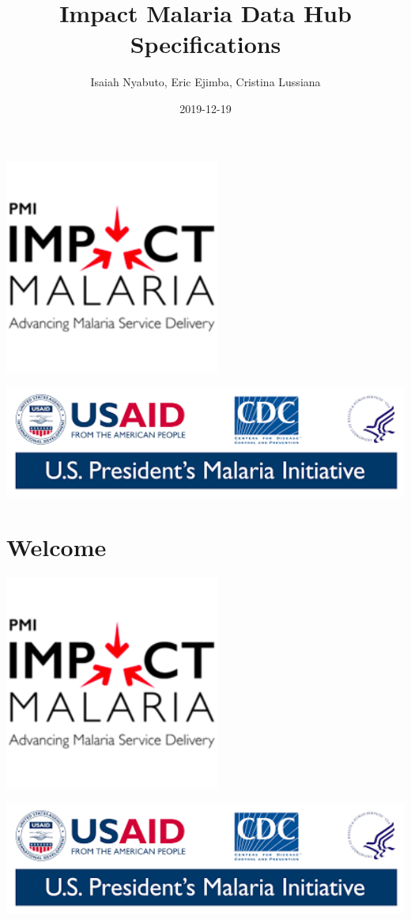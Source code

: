 \documentclass[]{book}
\title{Impact Malaria Data Hub Specifications}
\author{Isaiah Nyabuto, Eric Ejimba, Cristina Lussiana}
\date{2019-12-19}
\begin{document}
\maketitle

{
\setcounter{tocdepth}{1}
\tableofcontents
}
\includegraphics[width=2.78in]{./images/logo1}

\includegraphics[width=5.93in]{./images/logo2}

\hypertarget{welcome}{%
\chapter*{Welcome}\label{welcome}}

\includegraphics[width=2.78in]{./images/logo1}

\includegraphics[width=5.93in]{./images/logo2}
\end{document}

